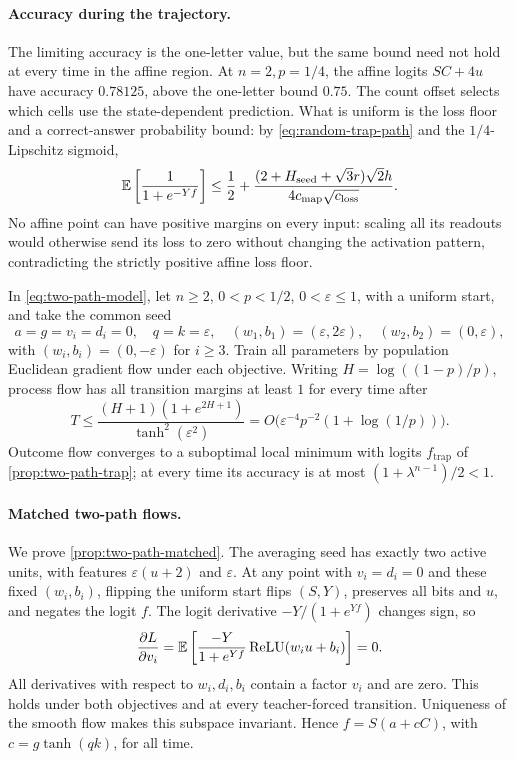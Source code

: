 \paragraph{Accuracy during the trajectory.}
The limiting accuracy is the one-letter value, but the same bound need not hold
at every time in the affine region. At $n=2,p=1/4$, the affine logits $SC+4u$
have accuracy $0.78125$, above the one-letter bound $0.75$.
The count offset selects which cells use the state-dependent prediction.
What is uniform is the loss floor and a correct-answer probability bound:
by \cref{eq:random-trap-path} and the $1/4$-Lipschitz sigmoid,
\[
 \mathbb E\left[\frac1{1+e^{-Yf}}\right]
 \le\frac12+
 \frac{(2+H_{\mathrm{seed}}+\sqrt3r)\sqrt2h}
      {4c_{\mathrm{map}}\sqrt{c_{\mathrm{loss}}}}.
\]
No affine point can have positive margins on every input: scaling all its readouts
would otherwise send its loss to zero without changing the activation pattern,
contradicting the strictly positive affine loss floor.

\begin{proposition}
\label{prop:two-path-matched}
In \cref{eq:two-path-model}, let $n\ge2$, $0<p<1/2$, $0<\varepsilon\le1$,
with a uniform start, and take the common seed
\[
 a=g=v_i=d_i=0,\quad q=k=\varepsilon,\quad
 (w_1,b_1)=(\varepsilon,2\varepsilon),\quad (w_2,b_2)=(0,\varepsilon),
\]
with $(w_i,b_i)=(0,-\varepsilon)$ for $i\ge3$.
Train all parameters by population Euclidean gradient flow under each objective.
Writing $H=\log((1-p)/p)$, process flow has all transition margins at least $1$
for every time after
\[
 T\le \frac{(H+1)(1+e^{2H+1})}{\tanh^2(\varepsilon^2)}
 =O\bigl(\varepsilon^{-4}p^{-2}(1+\log(1/p))\bigr).
\]
Outcome flow converges to a suboptimal local minimum with logits
$f_{\mathrm{trap}}$ of \cref{prop:two-path-trap}; at every time its accuracy is
at most $(1+\lambda^{n-1})/2<1$.
\end{proposition}

\paragraph{Matched two-path flows.}
\label{app:two-path-matched}
We prove \cref{prop:two-path-matched}. The averaging seed has exactly two active
units, with features $\varepsilon(u+2)$ and $\varepsilon$.
At any point with $v_i=d_i=0$ and these fixed $(w_i,b_i)$, flipping the uniform
start flips $(S,Y)$, preserves all bits and $u$, and negates the logit $f$.
The logit derivative $-Y/(1+e^{Yf})$ changes sign, so
\[
 \frac{\partial L}{\partial v_i}
 =\mathbb E\left[\frac{-Y}{1+e^{Yf}}\operatorname{ReLU}(w_i u+b_i)\right]=0.
\]
All derivatives with respect to $w_i,d_i,b_i$ contain a factor $v_i$ and are zero.
This holds under both objectives and at every teacher-forced transition.
Uniqueness of the smooth flow makes this subspace invariant. Hence
$f=S(a+cC)$, with $c=g\tanh(qk)$, for all time.

